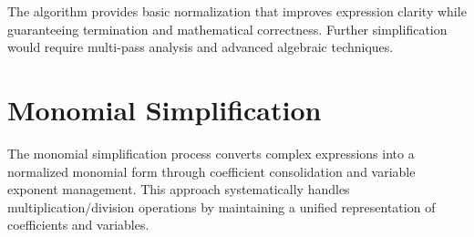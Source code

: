 \documentclass{report}
\begin{document}
The algorithm provides basic normalization that improves expression clarity while guaranteeing termination and mathematical correctness. Further simplification would require multi-pass analysis and advanced algebraic techniques.



\section*{Monomial Simplification}

The monomial simplification process converts complex expressions into a normalized monomial form through coefficient consolidation and variable exponent management. This approach systematically handles multiplication/division operations by maintaining a unified representation of coefficients and variables.
\end{document}
